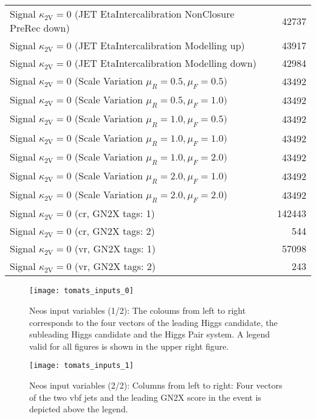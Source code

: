 \begin{table}[]
\begin{tabular}{lr}
        Signal $\kappa_\mathrm{2V}=0$ (JET EtaIntercalibration NonClosure PreRec down) & 42737  \\
        Signal $\kappa_\mathrm{2V}=0$ (JET EtaIntercalibration Modelling up)           & 43917  \\
        Signal $\kappa_\mathrm{2V}=0$ (JET EtaIntercalibration Modelling down)         & 42984  \\
        Signal $\kappa_\mathrm{2V}=0$ (Scale Variation $\mu_R = 0.5, \mu_F=0.5)$       & 43492  \\
        Signal $\kappa_\mathrm{2V}=0$ (Scale Variation $\mu_R = 0.5, \mu_F=1.0)$       & 43492  \\
        Signal $\kappa_\mathrm{2V}=0$ (Scale Variation $\mu_R = 1.0, \mu_F=0.5)$       & 43492  \\
        Signal $\kappa_\mathrm{2V}=0$ (Scale Variation $\mu_R = 1.0, \mu_F=1.0)$       & 43492  \\
        Signal $\kappa_\mathrm{2V}=0$ (Scale Variation $\mu_R = 1.0, \mu_F=2.0)$       & 43492  \\
        Signal $\kappa_\mathrm{2V}=0$ (Scale Variation $\mu_R = 2.0, \mu_F=1.0)$       & 43492  \\
        Signal $\kappa_\mathrm{2V}=0$ (Scale Variation $\mu_R = 2.0, \mu_F=2.0$)       & 43492  \\ \hline
        Signal $\kappa_\mathrm{2V}=0$ (\ac{cr}, GN2X tags: 1)                          & 142443 \\
        Signal $\kappa_\mathrm{2V}=0$ (\ac{cr}, GN2X tags: 2)                          & 544    \\
        Signal $\kappa_\mathrm{2V}=0$ (\ac{vr}, GN2X tags: 1)                          & 57098  \\
        Signal $\kappa_\mathrm{2V}=0$ (\ac{vr}, GN2X tags: 2)                          & 243    \\
    \end{tabular}
    \label{tab:neos-samples}
\end{table}


\begin{figure}
    \centering
    \texttt{[image: tomats\_inputs\_0]}
    \caption[]{Neos input variables (1/2): The coloums from left to right corresponds to the four vectors of the leading Higgs candidate, the subleading Higgs candidate and the Higgs Pair system. A legend valid for all figures is shown in the upper right figure.}
    \label{fig:tomats_inputs_0}
\end{figure}



\begin{figure}
    \centering
    \texttt{[image: tomats\_inputs\_1]}
    \caption[]{Neos input variables (2/2): Columns from left to right: Four vectors of the two vbf jets and the leading GN2X score in the event is depicted above the legend.}
    \label{fig:tomats_inputs_1}
\end{figure}
